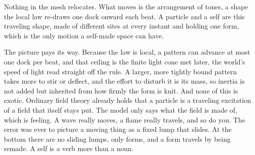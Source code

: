 \begin{result}
Nothing in the mesh relocates. What moves is the arrangement of tones, a shape the local law re-draws one dock onward each beat. A particle and a self are this traveling shape, made of different sites at every instant and holding one form, which is the only motion a self-made space can have. \cite{pollard2026vibetest}
\end{result}

The picture pays its way. Because the law is local, a pattern can advance at most one dock per beat, and that ceiling is the finite light cone met later, the world's speed of light read straight off the rule. A larger, more tightly bound pattern takes more to stir or deflect, and the effort to disturb it is its mass, so inertia is not added but inherited from how firmly the form is knit. And none of this is exotic. Ordinary field theory already holds that a particle is a traveling excitation of a field that itself stays put. The model only says what the field is made of, which is feeling. A wave really moves, a flame really travels, and so do you. The error was ever to picture a moving thing as a fixed lump that slides. At the bottom there are no sliding lumps, only forms, and a form travels by being remade. A self is a verb more than a noun.
